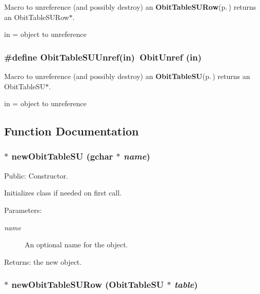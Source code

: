 Macro to unreference (and possibly destroy) an {\bf Obit\-Table\-SURow}{\rm (p.\,\pageref{structObitTableSURow})} returns an Obit\-Table\-SURow$\ast$. 

in = object to unreference 
\subsubsection{\setlength{\rightskip}{0pt plus 5cm}\#define Obit\-Table\-SUUnref(in)\ Obit\-Unref (in)}\label{ObitTableSU_8h_a1}


Macro to unreference (and possibly destroy) an {\bf Obit\-Table\-SU}{\rm (p.\,\pageref{structObitTableSU})} returns an Obit\-Table\-SU$\ast$. 

in = object to unreference 

\subsection{Function Documentation}
\subsubsection{$\ast$ new\-Obit\-Table\-SU (gchar $\ast$ {\em name})}\label{ObitTableSU_8h_a11}


Public: Constructor. 

Initializes class if needed on first call. \begin{Desc}
\item[Parameters:]
\begin{description}
\item[{\em name}]An optional name for the object. \end{description}
\end{Desc}
\begin{Desc}
\item[Returns:]the new object. \end{Desc}
\subsubsection{$\ast$ new\-Obit\-Table\-SURow ({\bf Obit\-Table\-SU} $\ast$ {\em table})}\label{ObitTableSU_8h_a8}


